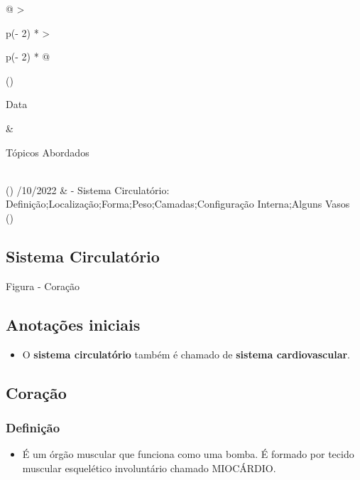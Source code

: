 \documentclass[
]{book}
\providecommand{\tightlist}{%
  \setlength{\itemsep}{0pt}\setlength{\parskip}{0pt}}
\begin{document}
\begin{longtable}[]{@{}
  >{\raggedright\arraybackslash}p{(\columnwidth - 2\tabcolsep) * }
  >{\raggedright\arraybackslash}p{(\columnwidth - 2\tabcolsep) * }@{}}
\toprule()
\begin{minipage}[b]{\linewidth}\raggedright
Data
\end{minipage} & \begin{minipage}[b]{\linewidth}\raggedright
Tópicos Abordados
\end{minipage} \\
\midrule()
/10/2022 & - Sistema Circulatório: Definição;Localização;Forma;Peso;Camadas;Configuração Interna;Alguns Vasos \\
\bottomrule()
\end{longtable}

\hypertarget{sistema-circulatuxf3rio}{%
\subsection{Sistema Circulatório}\label{sistema-circulatuxf3rio}}

Figura - Coração

\hypertarget{anotauxe7uxf5es-iniciais-1}{%
\subsection{Anotações iniciais}\label{anotauxe7uxf5es-iniciais-1}}

\begin{itemize}
\tightlist
\item
  O \textbf{sistema circulatório} também é chamado de \textbf{sistema cardiovascular}.
\end{itemize}

\hypertarget{corauxe7uxe3o}{%
\subsection{Coração}\label{corauxe7uxe3o}}

\hypertarget{definiuxe7uxe3o-2}{%
\subsubsection{Definição}\label{definiuxe7uxe3o-2}}

\begin{itemize}
\tightlist
\item
  É um órgão muscular que funciona como uma bomba. É formado por tecido muscular esquelético involuntário chamado MIOCÁRDIO.
\end{itemize}
\end{document}
